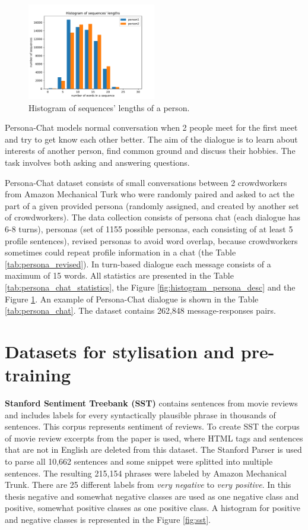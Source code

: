 \begin{figure}
  \centering
  \includegraphics[width=0.5\textwidth]{figures/uttr_length.pdf}
  \caption{Histogram of sequences' lengths of a person.}
  \label{fig:histogram_uttr_length}
\end{figure}

Persona-Chat models normal conversation when 2 people meet for the first meet and try to get know each other better. The aim of the dialogue is to learn about interests of another person, find common ground and discuss their hobbies. The task involves both asking and answering questions. 

Persona-Chat dataset consists of small conversations between 2 crowdworkers from Amazon Mechanical Turk who were randomly paired and asked to act the part of a given provided persona (randomly assigned, and created by another set of crowdworkers). The data collection consists of persona chat (each dialogue has 6-8 turns), personas (set of 1155 possible personas, each consisting of at least 5 profile sentences), revised personas to avoid word overlap, because crowdworkers sometimes could repeat profile information in a chat (the Table \ref{tab:persona_revised}). In turn-based dialogue each message consists of a maximum of 15 words. All statistics are presented in the Table \ref{tab:persona_chat_statistics}, the Figure \ref{fig:histogram_persona_desc} and the Figure \ref{fig:histogram_uttr_length}. An example of Persona-Chat dialogue is shown in the Table \ref{tab:persona_chat}. The dataset contains 262,848 message-responses pairs.

\section{Datasets for stylisation and pre-training} \label{stylistic_dataset_section}
\textbf{Stanford Sentiment Treebank (SST)} contains sentences from movie reviews and includes labels for every syntactically plausible phrase in thousands of sentences. This corpus represents sentiment of reviews. To create SST the corpus of movie review excerpts from the paper \cite{pang2005seeing} is used, where HTML tags and sentences that are not in English are deleted from this dataset. The Stanford Parser is used to parse all 10,662 sentences and some snippet were splitted into multiple sentences. The resulting 215,154 phrases were labeled by Amazon Mechanical Trunk. There are 25 different labels from \textit{very negative} to \textit{very positive}. In this thesis negative and somewhat negative classes are used as one negative class and positive, somewhat positive classes as one positive class. A histogram for positive and negative classes is represented in the Figure \ref{fig:sst}.

